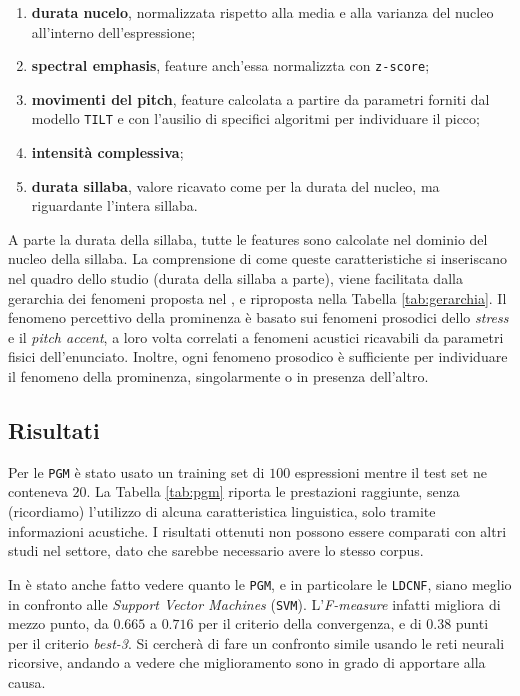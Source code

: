 \documentclass[twoside,twocolumn,11pt]{extarticle}
\theoremstyle{definition}
\begin{document}
		\begin{enumerate}
			\item \textbf{durata nucelo}, normalizzata rispetto alla media e alla varianza del nucleo all'interno dell'espressione;
			\item \textbf{spectral emphasis}, feature anch'essa normalizzta con \texttt{z-score};
			\item \textbf{movimenti del pitch}, feature calcolata a partire da parametri forniti dal modello \texttt{TILT} e con l'ausilio di specifici algoritmi per individuare il picco;
			\item \textbf{intensità complessiva};
			\item \textbf{durata sillaba}, valore ricavato come per la durata del nucleo, ma riguardante l'intera sillaba.
		\end{enumerate}
		
		A parte la durata della sillaba, tutte le features sono calcolate nel dominio del nucleo della sillaba. La comprensione di come queste caratteristiche si inseriscano nel quadro dello studio (durata della sillaba a parte), viene facilitata dalla gerarchia dei fenomeni proposta nel \cite[Capitolo 3]{bib:fenomeni-prosodici-prominenza}, e riproposta nella Tabella \ref{tab:gerarchia}. Il fenomeno percettivo della prominenza è basato sui fenomeni prosodici dello \textit{stress}	e il \textit{pitch accent}, a loro volta correlati a fenomeni acustici ricavabili da parametri fisici dell'enunciato. Inoltre, ogni fenomeno prosodico è sufficiente per individuare il fenomeno della prominenza, singolarmente o in presenza dell'altro.
		
	\subsection{Risultati}
		
		Per le \texttt{PGM} è stato usato un training set di $100$ espressioni mentre il test set ne conteneva $20$. La Tabella \ref{tab:pgm} riporta le prestazioni raggiunte, senza (ricordiamo) l'utilizzo di alcuna caratteristica linguistica, solo tramite informazioni acustiche. I risultati ottenuti non possono essere comparati con altri studi nel settore, dato che sarebbe necessario avere lo stesso corpus.
		
		In \cite{bib:prominence-detection-italian} è stato anche fatto vedere quanto le \texttt{PGM}, e in particolare le \texttt{LDCNF}, siano meglio in confronto alle \textit{Support Vector Machines} (\texttt{SVM}). L'\textit{F-measure} infatti migliora di mezzo punto, da $0.665$ a $0.716$ per il criterio della convergenza, e di $0.38$ punti per il criterio \textit{best-3}. Si cercherà di fare un confronto simile usando le reti neurali ricorsive, andando a vedere che miglioramento sono in grado di apportare alla causa.
	
\end{document}
